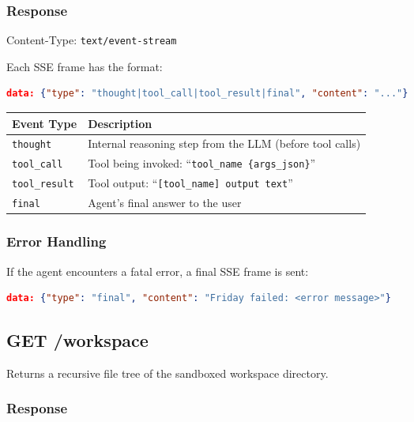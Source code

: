 \documentclass[11pt,a4paper]{article}
\newcommand{\httpget}{\textcolor{getgreen}{\textbf{GET}}}
\begin{document}
\subsubsection{Response}

Content-Type: \texttt{text/event-stream}

Each SSE frame has the format:

\begin{lstlisting}[language=json,title={SSE data frame}]
data: {"type": "thought|tool_call|tool_result|final", "content": "..."}
\end{lstlisting}

\begin{table}[h!]
\centering
\begin{tabular}{@{}lp{9cm}@{}}
\toprule
\textbf{Event Type} & \textbf{Description} \\
\midrule
\texttt{thought} & Internal reasoning step from the LLM (before tool calls) \\
\texttt{tool\_call} & Tool being invoked: ``\texttt{tool\_name \{args\_json\}}'' \\
\texttt{tool\_result} & Tool output: ``\texttt{[tool\_name] output text}'' \\
\texttt{final} & Agent's final answer to the user \\
\bottomrule
\end{tabular}
\end{table}

\subsubsection{Error Handling}

If the agent encounters a fatal error, a final SSE frame is sent:

\begin{lstlisting}[language=json]
data: {"type": "final", "content": "Friday failed: <error message>"}
\end{lstlisting}

\subsection{\httpget{} /workspace}

Returns a recursive file tree of the sandboxed workspace directory.

\subsubsection{Response}
\end{document}
